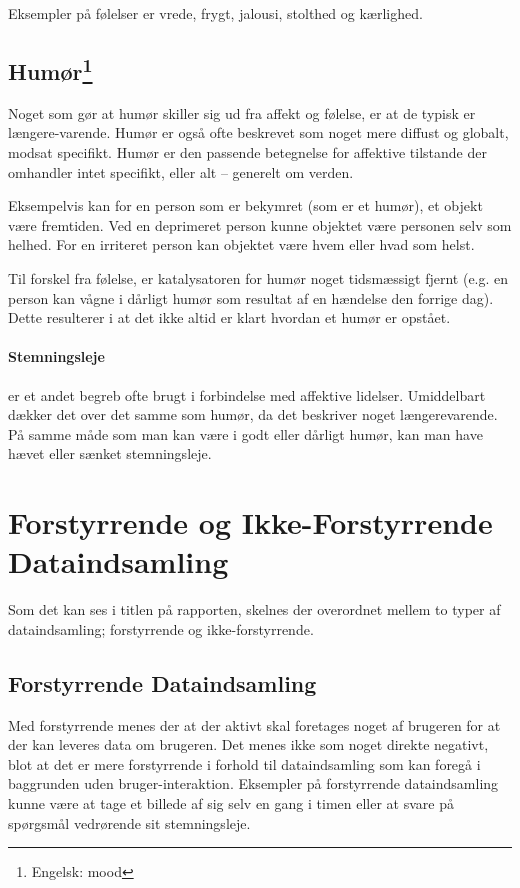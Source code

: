 Eksempler på følelser er vrede, frygt, jalousi, stolthed og kærlighed.\cite[p. 322]{ekkekakis}

\subsection[Humør]{Humør\footnote{Engelsk: mood}}
Noget som gør at humør skiller sig ud fra affekt og følelse, er at de typisk er længere-varende.
Humør er også ofte beskrevet som noget mere diffust og globalt, modsat specifikt.
Humør er den passende betegnelse for affektive tilstande der omhandler intet specifikt, eller alt -- generelt om verden.

Eksempelvis kan for en person som er bekymret (som er et humør), et objekt være fremtiden.
Ved en deprimeret person kunne objektet være personen selv som helhed.
For en irriteret person kan objektet være hvem eller hvad som helst.

Til forskel fra følelse, er katalysatoren for humør noget tidsmæssigt fjernt (e.g. en person kan vågne i dårligt humør som resultat af en hændelse den forrige dag).
Dette resulterer i at det ikke altid er klart hvordan et humør er opstået.\cite[p. 322]{ekkekakis}

\paragraph{Stemningsleje} er et andet begreb ofte brugt i forbindelse med affektive lidelser.
Umiddelbart dækker det over det samme som humør, da det beskriver noget længerevarende.
På samme måde som man kan være i godt eller dårligt humør, kan man have hævet eller sænket stemningsleje.

\section{Forstyrrende og Ikke-Forstyrrende Dataindsamling}
Som det kan ses i titlen på rapporten, skelnes der overordnet mellem to typer af dataindsamling; forstyrrende og ikke-forstyrrende.

\subsection{Forstyrrende Dataindsamling}
Med forstyrrende menes der at der aktivt skal foretages noget af brugeren for at der kan leveres data om brugeren.
Det menes ikke som noget direkte negativt, blot at det er mere forstyrrende i forhold til dataindsamling som kan foregå i baggrunden uden bruger-interaktion.
Eksempler på forstyrrende dataindsamling kunne være at tage et billede af sig selv en gang i timen eller at svare på spørgsmål vedrørende sit stemningsleje.

